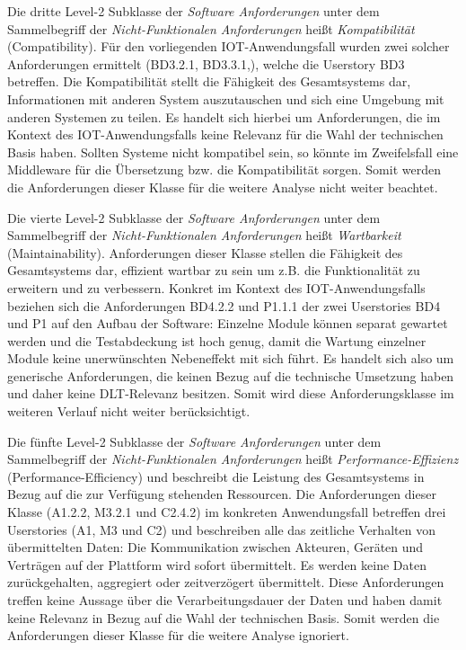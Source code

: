Die dritte Level-2 Subklasse der \textit{Software Anforderungen} unter dem Sammelbegriff der \textit{Nicht-Funktionalen Anforderungen} heißt \textit{Kompatibilität} (Compatibility). Für den vorliegenden IOT-Anwendungsfall wurden zwei solcher Anforderungen ermittelt (BD3.2.1, BD3.3.1,), welche die Userstory BD3 betreffen. Die Kompatibilität stellt die Fähigkeit des Gesamtsystems dar, Informationen mit anderen System auszutauschen und sich eine Umgebung mit anderen Systemen zu teilen. Es handelt sich hierbei um Anforderungen, die im Kontext des \ac{IOT}-Anwendungsfalls keine Relevanz für die Wahl der technischen Basis haben. Sollten Systeme nicht kompatibel sein, so könnte im Zweifelsfall eine Middleware für die Übersetzung bzw. die Kompatibilität sorgen. Somit werden die Anforderungen dieser Klasse für die weitere Analyse nicht weiter beachtet.


Die vierte Level-2 Subklasse der \textit{Software Anforderungen} unter dem Sammelbegriff der \textit{Nicht-Funktionalen Anforderungen} heißt \textit{Wartbarkeit} (Maintainability). Anforderungen dieser Klasse stellen die Fähigkeit des Gesamtsystems dar, effizient wartbar zu sein um z.B. die Funktionalität zu erweitern und zu verbessern. Konkret im Kontext des \ac{IOT}-Anwendungsfalls beziehen sich die Anforderungen BD4.2.2 und P1.1.1 der zwei Userstories BD4 und P1 auf den Aufbau der Software: Einzelne Module können separat gewartet werden und die Testabdeckung ist hoch genug, damit die Wartung einzelner Module keine unerwünschten Nebeneffekt mit sich führt. Es handelt sich also um generische Anforderungen, die keinen Bezug auf die technische Umsetzung haben und daher keine \ac{DLT}-Relevanz besitzen. Somit wird diese Anforderungsklasse im weiteren Verlauf nicht weiter berücksichtigt.


Die fünfte Level-2 Subklasse der \textit{Software Anforderungen} unter dem Sammelbegriff der \textit{Nicht-Funktionalen Anforderungen} heißt \textit{Performance-Effizienz} (Performance-Efficiency) und beschreibt die Leistung des Gesamtsystems in Bezug auf die zur Verfügung stehenden Ressourcen. Die Anforderungen dieser Klasse (A1.2.2, M3.2.1 und C2.4.2) im konkreten Anwendungsfall betreffen drei Userstories (A1, M3 und C2) und beschreiben alle das zeitliche Verhalten von übermittelten Daten: Die Kommunikation zwischen Akteuren, Geräten und Verträgen auf der Plattform wird sofort übermittelt. Es werden keine Daten zurückgehalten, aggregiert oder zeitverzögert übermittelt. Diese Anforderungen treffen keine Aussage über die Verarbeitungsdauer der Daten und haben damit keine Relevanz in Bezug auf die Wahl der technischen Basis. Somit werden die Anforderungen dieser Klasse für die weitere Analyse ignoriert.


